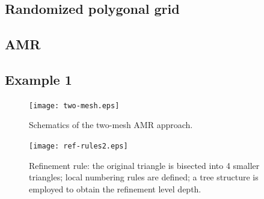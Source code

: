 \documentclass[preprint,10pt]{elsarticle}
\renewcommand{\(}{\left(}
\renewcommand{\)}{\right)}
\renewcommand{\[}{\left[}
\renewcommand{\]}{\right]}
\begin{document}
\subsection{Randomized polygonal grid}

\subsection{AMR}



\subsection{Example 1} \label{sec:ex1}





\pagebreak

\begin{figure}[h]
\begin{center}
\texttt{[image: two-mesh.eps]}
\end{center}
\caption{Schematics of the two-mesh AMR approach.}
\label{fig:2-mesh-schematics}
\end{figure}

\pagebreak

\begin{figure}[h]
\begin{center}
\texttt{[image: ref-rules2.eps]}
\end{center}
\caption{Refinement rule: the original triangle is bisected into 4 smaller triangles; 
local numbering rules are defined; a tree structure is employed to obtain the refinement level depth.}
\label{fig:triangle-ref-rule}
\end{figure}
\end{document}
